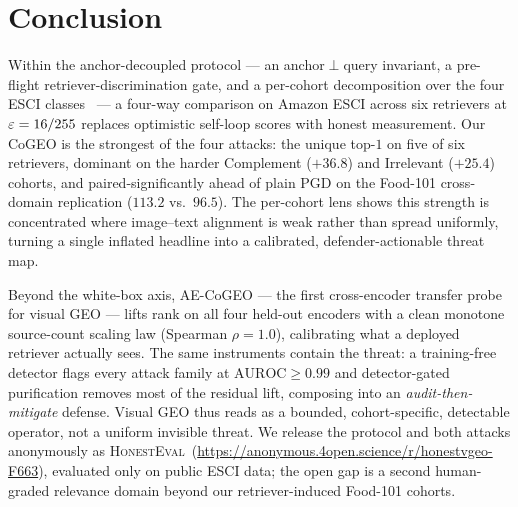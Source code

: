 \section{Conclusion}
\label{sec:conclusion}

Within the anchor-decoupled protocol --- an anchor$\perp$query invariant, a pre-flight retriever-discrimination gate, and a per-cohort decomposition over the four ESCI classes~\cite{reddy2022esci} --- a four-way comparison on Amazon ESCI across six retrievers at $\varepsilon = 16/255$ replaces optimistic self-loop scores with honest measurement. Our CoGEO is the strongest of the four attacks: the unique top-$1$ on five of six retrievers, dominant on the harder Complement ($+36.8$) and Irrelevant ($+25.4$) cohorts, and paired-significantly ahead of plain PGD on the Food-101 cross-domain replication ($113.2$ vs.\ $96.5$). The per-cohort lens shows this strength is concentrated where image--text alignment is weak rather than spread uniformly, turning a single inflated headline into a calibrated, defender-actionable threat map.

Beyond the white-box axis, AE-CoGEO --- the first cross-encoder transfer probe for visual GEO --- lifts rank on all four held-out encoders with a clean monotone source-count scaling law (Spearman $\rho = 1.0$), calibrating what a deployed retriever actually sees. The same instruments contain the threat: a training-free detector flags every attack family at $\mathrm{AUROC} \geq 0.99$ and detector-gated purification removes most of the residual lift, composing into an \emph{audit-then-mitigate} defense. Visual GEO thus reads as a bounded, cohort-specific, detectable operator, not a uniform invisible threat. We release the protocol and both attacks anonymously as \textsc{HonestEval}~(\url{https://anonymous.4open.science/r/honestvgeo-F663}), evaluated only on public ESCI data; the open gap is a second human-graded relevance domain beyond our retriever-induced Food-101 cohorts.
